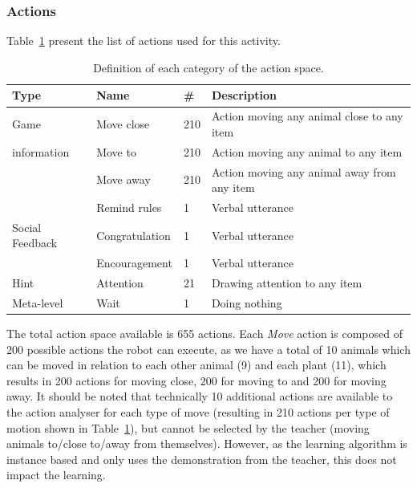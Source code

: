
\subsubsection{Actions}

Table~\ref{tab:tuto_actions_space} present the list of actions used for this activity.

\begin{table}[ht]
	\centering
	\caption{Definition of each category of the action space.}
	\label{tab:tuto_actions_space}
	\begin{tabularx}{\textwidth}{@{}lllX@{}}\toprule
		Type & Name & \# & Description \\
		\midrule
		Game & Move close & 210 &  Action moving any animal close to any item\\
		information & Move to & 210 & Action moving any animal to any item\\
		& Move away & 210 & Action moving any animal away from any item\\
		& Remind rules & 1 & Verbal utterance\\
		Social Feedback & Congratulation & 1 & Verbal utterance\\
		& Encouragement & 1 & Verbal utterance\\
		Hint & Attention & 21 & Drawing attention to any item\\
		Meta-level & Wait & 1 & Doing nothing\\
		\bottomrule
	\end{tabularx}
\end{table}

The total action space available is 655 actions. Each \emph{Move} action is composed of 200 possible actions the robot can execute, as we have a total of 10 animals which can be moved in relation to each other animal (9) and each plant (11), which results in 200 actions for moving close, 200 for moving to and 200 for moving away. It should be noted that technically 10 additional actions are available to the action analyser for each type of move (resulting in 210 actions per type of motion shown in Table~\ref{tab:tuto_actions_space}), but cannot be selected by the teacher (moving animals to/close to/away from themselves). However, as the learning algorithm is instance based and only uses the demonstration from the teacher, this does not impact the learning. 

